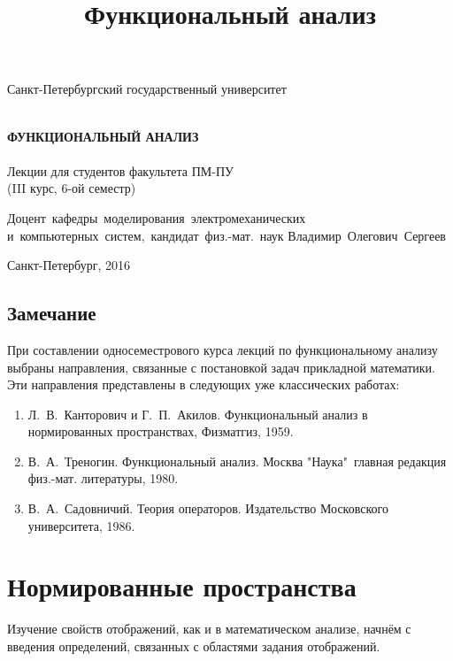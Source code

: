 \documentclass[12pt,a4paper,titlepage,oneside]{book}
\title{Функциональный анализ}
\theoremstyle{definition}
\theoremstyle{plain}
\theoremstyle{remark}
\theoremstyle{remark}
\theoremstyle{remark}
\theoremstyle{remark}
\theoremstyle{plain}
\theoremstyle{plain}
\begin{document}
\begin{titlepage}

\begin{center}
\vfill

Санкт-Петербургский государственный университет\\
\ \\

\vfill

{\large\bf ФУНКЦИОНАЛЬНЫЙ АНАЛИЗ\\}
\ \\
Лекции для студентов факультета ПМ-ПУ\\
(III курс, 6-ой семестр)

\vfill

\hfill\vbox
{
\hbox{Доцент кафедры моделирования электромеханических}
\hbox{и компьютерных систем, кандидат физ.-мат. наук}
\hbox{Владимир Олегович Сергеев}
}

\vfill

Санкт-Петербург, 2016
\end{center}

\end{titlepage}

\tableofcontents

\newpage

\section*{Замечание}

При составлении односеместрового курса лекций по функциональному анализу выбраны направления, связанные с постановкой задач прикладной математики. Эти направления представлены в следующих уже классических работах:
\begin{enumerate}
    \item Л.~В.~Канторович и Г.~П.~Акилов. Функциональный анализ в нормированных пространствах, Физматгиз, 1959.
    \item В.~А.~Треногин. Функциональный анализ. Москва "Наука"\, главная редакция физ.-мат. литературы, 1980.
    \item В.~А.~Садовничий. Теория операторов. Издательство Московского университета, 1986.
\end{enumerate}

\chapter{Нормированные пространства}

Изучение свойств отображений, как и в математическом анализе, начнём с введения определений, связанных с областями задания отображений.
\end{document}
